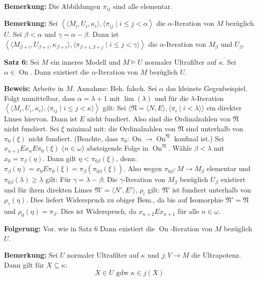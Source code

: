 \documentclass[a4paper,fontsize=11pt]{scrartcl}
\newcommand{\On}{\operatorname{On}}
\begin{document}
{\bf Bemerkung:} Die Abbildungen $\pi_{ij}$ sind alle elementar.

{\bf Bemerkung:} Sei $\left\langle\langle M_i, U_i,\kappa_i\rangle, \langle \pi_{ij}\mid i\le j<\alpha\right\rangle$ die $\alpha$-Iteration von $M$ bezüglich $U$.
	Sei $\beta<\alpha$ und $\gamma=\alpha-\beta$.
	Dann ist $\left\langle\langle M_{\beta+i}, U_{\beta+i}, \kappa_{\beta+i}\rangle,\langle \pi_{\beta+i,\beta+j}\mid i\le j <\gamma\rangle\right\rangle$
	die $\alpha$-Iteration von $M_{\beta}$ und $U_{\beta}$.

{\bf Satz 6:} Sei $M$ ein inneres Modell und $M\models U$ normaler Ultrafilter auf $\kappa$.
	Sei $\alpha\in\On$. 
	Dann existiert die $\alpha$-Iteration von $M$ bezüglich $U$.

	{\bf Beweis:} Arbeite in $M$. Annahme: Beh. falsch.
		Sei $\alpha$ das kleinste Gegenbeispiel.
		Folgt unmittelbar, dass $\alpha=\lambda+1$ mit $\lim(\lambda)$ und für die $\lambda$-Iteration
		$\left\langle\langle M_i, U_i, \kappa_i\rangle, \langle\pi_{ij}\mid i\le j <\kappa\rangle\right\rangle$ gilt:
		Sei $\langle \mathfrak N=\langle N, E\rangle, \langle \pi_i\mid i<\lambda\rangle\rangle$ ein direkter Limes hiervon.
		Dann ist $E$ nicht fundiert.
		Also sind die Ordinalzahlen von $\mathfrak N$ nicht fundiert.
		Sei $\xi$ minimal mit: die Ordinalzahlen von $\mathfrak N$ sind unterhalb von $\pi_0(\xi)$ nicht fundiert.
		(Beachte, dass $\pi_0\colon \On\to\On^{\mathfrak N}$ konfinal ist.)
		Sei $x_{n+1}Ex_nE\pi_0(\xi)$ ($n\in\omega$) absteigende Folge in $\On^{\mathfrak N}$.
		Wähle $\beta<\lambda$ mit $x_0=\pi_{\beta}(\eta)$.
		Dann gilt $\eta<\pi_{0\beta}(\xi)$, denn: $\pi_{\beta}(\eta)=x_0E\pi_0(\xi)=\pi_{\beta}(\pi_{0\beta}(\xi))$.
		Also wegen $\pi_{0\beta}\colon M\to M_{\beta}$ elementar und $\pi_{0\beta}(\lambda)\ge\lambda$ gilt:
		Für $\gamma=\lambda-\beta$: Die $\gamma$-Iteration von $M_{\beta}$ bezüglich $U_{\beta}$ existiert und für ihren direkten Limes $\mathfrak N'=\langle N',E'\rangle$, $\rho_i$ gilt:
			$\mathfrak N'$ ist fundiert unterhalb von $\rho_{\gamma}(\eta)$.
		Dies liefert Widerspruch zu obiger Bem., da bis auf Isomorphie $\mathfrak N'=\mathfrak N$ und $\rho_0(\eta)=\pi_{\beta}$.
		Dies ist Widerspruch, da $x_{n+2}Ex_{n+1}$ für alle $n\in\omega$.

{\bf Folgerung:} 	Vor. wie in Satz 6
	Dann existiert die $\On$-Iteration von $M$ bezüglich $U$.

{\bf Bemerkung:} Sei $U$ normaler Ultrafilter auf $\kappa$ und $j\colon V\to M$ die Ultrapotenz.
	Dann gilt für $X\subseteq\kappa$: \[X\in U \mbox{ gdw } \kappa\in j(X)\]
\end{document}

